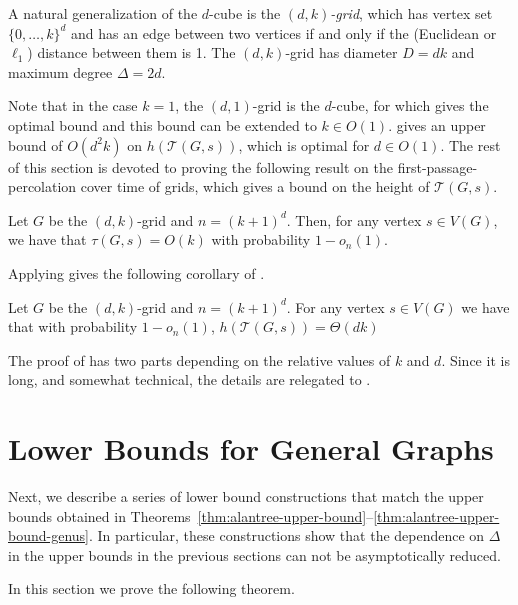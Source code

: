 \documentclass{patmorin}
\newcommand{\tcal}{\mathcal{T}}
\begin{document}
A natural generalization of the $d$-cube is the \emph{$(d,k)$-grid}, which
has vertex set $\{0,\ldots,k\}^d$ and has an edge between two vertices
if and only if the (Euclidean or $\ell_1$) distance between them is 1.
The $(d,k)$-grid has diameter $D=dk$ and maximum degree $\Delta=2d$.

Note that in the case $k=1$, the $(d,1)$-grid is the $d$-cube, for which
 gives the optimal bound and this
bound can be extended to $k\in O(1)$.   
gives an upper bound of $O(d^2k)$ on $h(\tcal(G,s))$, which is optimal
for $d\in O(1)$.  The rest of this section is devoted to proving the
following result on the first-passage-percolation cover time of grids,
which gives a bound on the height of $\tcal(G,s)$.

\begin{thm}
Let $G$ be the $(d,k)$-grid and $n=(k+1)^d$.  Then, for any vertex $s\in
V(G)$, we have that $\tau(G,s)= O(k)$ with probability $1-o_n(1)$.
\end{thm}

Applying  gives the following corollary of
.

\begin{cor}
Let $G$ be the $(d,k)$-grid and $n=(k+1)^d$.  For any vertex $s\in V(G)$
we have that with probability $1-o_n(1)$, $ h(\tcal(G,s)) = \Theta(dk)$
\end{cor}


The proof of  has two parts depending on the
relative values of $k$ and $d$.  Since it is long, and somewhat technical,
the details are relegated to .



\section{Lower Bounds for General Graphs}

Next, we describe a series of lower bound
constructions that match the upper bounds obtained in
Theorems~\ref{thm:alantree-upper-bound}--\ref{thm:alantree-upper-bound-genus}.
In particular, these constructions show that the dependence on $\Delta$
in the upper bounds in the previous sections can not be asymptotically
reduced.

In this section we prove the following theorem.
\end{document}
